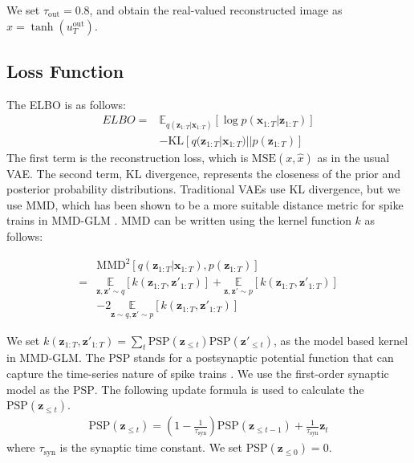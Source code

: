 \documentclass[letterpaper]{article} %
\begin{document}
We set $\tau_{\mathrm{out}}=0.8$, and obtain the real-valued reconstructed image as $\hat{x}=\tanh (u_T^{\mathrm{out}})$.

\subsection{Loss Function}

The ELBO is as follows:
\begin{align}
    ELBO =& \mathbb{E}_{q(\bm{z}_{1:T}|\bm{x}_{1:T})}[\log p(\bm{x}_{1:T}|\bm{z}_{1:T})]\nonumber \\
        & - \mathrm{KL}[q(\bm{z}_{1:T}|\bm{x}_{1:T})||p(\bm{z}_{1:T})] \label{ELBO}
\end{align}
The first term is the reconstruction loss, which is $\mathrm{MSE}(x,\hat{x})$ as in the usual VAE. The second term, KL divergence, represents the closeness of the prior and posterior probability distributions. Traditional VAEs use KL divergence, but we use MMD, which has been shown to be a more suitable distance metric for spike trains in MMD-GLM \cite{mmdglm}. MMD can be written using the kernel function $k$ as follows:

\begin{align}
    &\mathrm{MMD}^2[q(\bm{z}_{1:T}|\bm{x}_{1:T}),p(\bm{z}_{1:T})] \nonumber\\
    =&\underset{\bm{z},\bm{z}'\sim q}{\mathbb{E}}[k(\bm{z}_{1:T},\bm{z}'_{1:T})] +\underset{\bm{z},\bm{z}'\sim p}{\mathbb{E}}[k(\bm{z}_{1:T},\bm{z}'_{1:T})]\nonumber\\
    &-2\underset{\bm{z}\sim q,\bm{z}'\sim p}{\mathbb{E}}[k(\bm{z}_{1:T},\bm{z}'_{1:T})] \label{eq:mmd}
\end{align}

We set $k(\bm{z}_{1:T},\bm{z}'_{1:T})=\sum_t \mathrm{PSP}(\bm{z}_{\leq t})\mathrm{PSP}(\bm{z}'_{\leq t})$, as the model based kernel in MMD-GLM. The $\mathrm{PSP}$ stands for a postsynaptic potential function that can capture the time-series nature of spike trains \cite{superspike}. We use the first-order synaptic model \cite{tsslbp} as the $\mathrm{PSP}$. The following update formula is used to calculate the $\mathrm{PSP}(\bm{z}_{\leq t})$.
\begin{align}
    \mathrm{PSP}(\bm{z}_{\leq t}) = \left( 1-\frac{1}{\tau_{\mathrm{syn}}}\right) \mathrm{PSP}(\bm{z}_{\leq t-1}) + \frac{1}{\tau_{\mathrm{syn}}}\bm{z}_t \label{eq:psp}
\end{align}
where $\tau_{\mathrm{syn}}$ is the synaptic time constant. We set $\mathrm{PSP}(\bm{z}_{\leq 0})=0$. 
\end{document}
